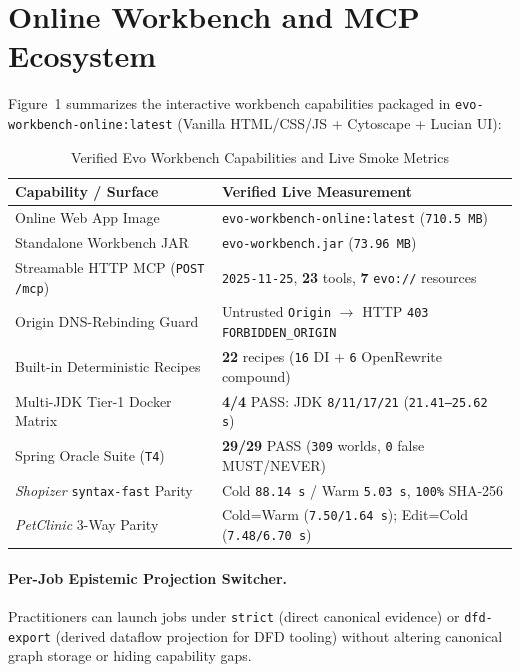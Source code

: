 \documentclass[sigconf,nonacm]{acmart}
\begin{document}
\section{Online Workbench and MCP Ecosystem}
Figure~1 summarizes the interactive workbench capabilities packaged in \texttt{evo-workbench-online:latest} (Vanilla HTML/CSS/JS + Cytoscape + Lucian UI):

\begin{table}[t]
\centering
\caption{Verified Evo Workbench Capabilities and Live Smoke Metrics}
\label{tab:workbench-metrics}
\begin{tabular}{@{}ll@{}}
\toprule
\textbf{Capability / Surface} & \textbf{Verified Live Measurement} \\
\midrule
Online Web App Image & \texttt{evo-workbench-online:latest} (\texttt{710.5 MB}) \\
Standalone Workbench JAR & \texttt{evo-workbench.jar} (\texttt{73.96 MB}) \\
Streamable HTTP MCP (\texttt{POST /mcp}) & \texttt{2025-11-25}, \textbf{23} tools, \textbf{7} \texttt{evo://} resources \\
Origin DNS-Rebinding Guard & Untrusted \texttt{Origin} $\rightarrow$ HTTP \texttt{403 FORBIDDEN\_ORIGIN} \\
Built-in Deterministic Recipes & \textbf{22} recipes (\texttt{16} DI + \texttt{6} OpenRewrite compound) \\
Multi-JDK Tier-1 Docker Matrix & \textbf{4/4} PASS: JDK \texttt{8/11/17/21} (\texttt{21.41--25.62 s}) \\
Spring Oracle Suite (\texttt{T4}) & \textbf{29/29} PASS (\texttt{309} worlds, \texttt{0} false MUST/NEVER) \\
\textit{Shopizer} \texttt{syntax-fast} Parity & Cold \texttt{88.14 s} / Warm \texttt{5.03 s}, \texttt{100\%} SHA-256 \\
\textit{PetClinic} 3-Way Parity & Cold=Warm (\texttt{7.50/1.64 s}); Edit=Cold (\texttt{7.48/6.70 s}) \\
\bottomrule
\end{tabular}
\end{table}

\paragraph{Per-Job Epistemic Projection Switcher.} Practitioners can launch jobs under \texttt{strict} (direct canonical evidence) or \texttt{dfd-export} (derived dataflow projection for DFD tooling) without altering canonical graph storage or hiding capability gaps.
\end{document}
